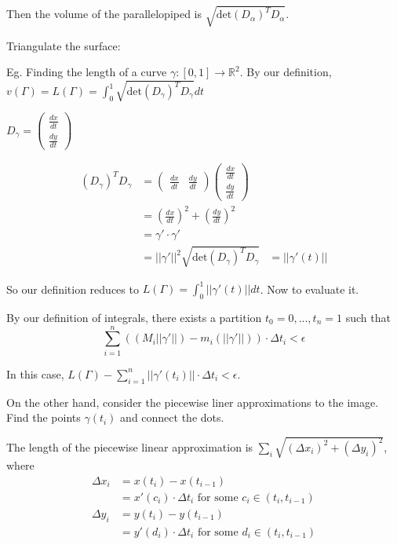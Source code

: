 Then the volume of the parallelopiped is $\sqrt{\text{det}(D_{\alpha})^T D_{\alpha}}$.

Triangulate the surface:

Eg. 
Finding the length of a curve $\gamma: [0,1]\rightarrow \mathbb{R}^2$.
By our definition, $v(\Gamma)=L(\Gamma)=\int_0^1\sqrt{\text{det}(D_{\gamma})^T D_{\gamma}}dt$

$D_{\gamma}= \left( \begin{array}{c}
\frac{dx}{dt} \\
\frac{dy}{dt} \end{array} \right)$

\begin{align*}
(D_{\gamma})^TD_{\gamma}&= \left( \begin{array}{cc}
\frac{dx}{dt} & \frac{dy}{dt} \end{array} \right) \left( \begin{array}{c}
\frac{dx}{dt} \\
\frac{dy}{dt} \end{array} \right)\\
&= (\frac{dx}{dt})^2+(\frac{dy}{dt})^2\\
&=\gamma'\cdot\gamma'\\
&=||\gamma'||^2
\sqrt{\text{det}(D_{\gamma})^T D_{\gamma}}&=||\gamma'(t)||
\end{align*}

So our definition reduces to $L(\Gamma)=\int_0^1||\gamma'(t)||dt$.  Now to evaluate it.

By our definition of integrals, there exists a partition $t_0=0,...,t_n=1$ such that
$$\sum\limits_{i=1}^n((M_i||\gamma'||)-m_i(||\gamma'||))\cdot \Delta t_i < \epsilon$$

In this case, $L(\Gamma)-\sum\limits_{i=1}^n||\gamma'(t_i)||\cdot\Delta t_i < \epsilon$.

On the other hand, consider the piecewise liner approximations to the image.  Find the points $\gamma(t_i)$ and connect the dots.

The length of the piecewise linear approximation is $\sum\limits_i\sqrt{(\Delta x_i)^2+(\Delta y_i)^2}$,
where
\begin{align*}
\Delta x_i &= x(t_i)-x(t_{i-1})\\
&= x'(c_i) \cdot \Delta t_i \text{ for some } c_i\in (t_i,t_{i-1})\\
\Delta y_i &= y(t_i)-y(t_{i-1})\\
&= y'(d_i) \cdot \Delta t_i \text{ for some } d_i\in (t_i,t_{i-1})
\end{align*}


